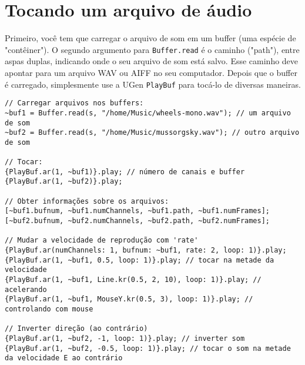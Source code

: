 \section{Tocando um arquivo de áudio}

Primeiro, você tem que carregar o arquivo de som em um buffer (uma espécie de "contêiner"). O segundo argumento para \texttt{Buffer.read} é o caminho ("path"), entre aspas duplas, indicando onde o seu arquivo de som está salvo. Esse caminho deve apontar para um arquivo WAV ou AIFF no seu computador. Depois que o buffer é carregado, simplesmente use a UGen \texttt{PlayBuf} para tocá-lo de diversas maneiras.

\bigskip
{}
\bigskip

\begin{lstlisting}[style=SuperCollider-IDE, basicstyle=\scttfamily\footnotesize]
// Carregar arquivos nos buffers:
~buf1 = Buffer.read(s, "/home/Music/wheels-mono.wav"); // um arquivo de som
~buf2 = Buffer.read(s, "/home/Music/mussorgsky.wav"); // outro arquivo de som

// Tocar:
{PlayBuf.ar(1, ~buf1)}.play; // número de canais e buffer
{PlayBuf.ar(1, ~buf2)}.play;

// Obter informações sobre os arquivos:
[~buf1.bufnum, ~buf1.numChannels, ~buf1.path, ~buf1.numFrames];
[~buf2.bufnum, ~buf2.numChannels, ~buf2.path, ~buf2.numFrames];

// Mudar a velocidade de reprodução com 'rate' 
{PlayBuf.ar(numChannels: 1, bufnum: ~buf1, rate: 2, loop: 1)}.play;
{PlayBuf.ar(1, ~buf1, 0.5, loop: 1)}.play; // tocar na metade da velocidade
{PlayBuf.ar(1, ~buf1, Line.kr(0.5, 2, 10), loop: 1)}.play; // acelerando
{PlayBuf.ar(1, ~buf1, MouseY.kr(0.5, 3), loop: 1)}.play; // controlando com mouse

// Inverter direção (ao contrário)
{PlayBuf.ar(1, ~buf2, -1, loop: 1)}.play; // inverter som
{PlayBuf.ar(1, ~buf2, -0.5, loop: 1)}.play; // tocar o som na metade da velocidade E ao contrário
\end{lstlisting}
